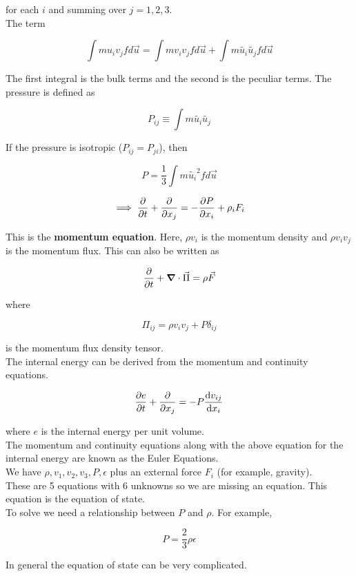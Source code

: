\documentclass[]{article}
\begin{document}
for each $i$ and summing over $j=1,2, 3$.\\

The term 

\[\int m u_i v_j f d\vec{u} = \int m v_i v_j f d\vec{u} + \int m \tilde{u_i} \tilde{u_j} f d\vec{u}\]

The first integral is the bulk terms and the second is the peculiar terms. The pressure is defined as

\[P_{ij} \equiv \int m \tilde{u_i} \tilde{u_j} \]

If the pressure is isotropic ($P_{ij} = P_{ji}$), then 

\[P= \frac{1}{3} \int m \tilde{u_i}^2 f d\vec{u}\]

\[\implies \pdv{}{t}(\rho v_i) + \pdv{}{x_j}(\rho v_i v_j) = - \pdv{P}{x_i} + \rho_i F_i\]

This is the \textbf{momentum equation}. Here, $\rho v_i$ is the momentum density and $\rho v_i v_j$ is the momentum flux. This can also be written as 

\[\pdv{}{t}(\rho \vec{v}) + \grad{}\cdot \vec{\Pi} = \rho \vec{F}\]

where 

\[\Pi_{ij} = \rho v_i v_j + P \delta_{ij}\]

is the momentum flux density tensor.\\

The internal energy can be derived from the momentum and continuity equations.

\[\pdv{e}{t} + \pdv{}{x_j}(ev_j) = - P \dv{v_{ij}}{x_i}\]

where $e$ is the internal energy per unit volume.\\

The momentum and continuity equations along with the above equation for the internal energy are known as the Euler Equations.\\

We have $\rho, v_1, v_2, v_3, P, \epsilon$ plus an external force $F_i$ (for example, gravity). \\

These are 5 equations with 6 unknowns so we are missing an equation. This equation is the equation of state.\\

To solve we need a relationship between $P$ and $\rho$. For example,

\[P= \frac{2}{3}\rho \epsilon\]

In general the equation of state can be very complicated.\\
\end{document}
